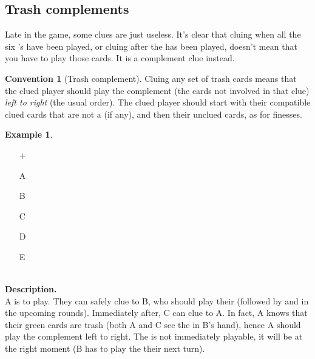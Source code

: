 \documentclass[a4paper]{article}
\theoremstyle{plain}
\theoremstyle{definition}
\newtheorem{example}[theorem]{Example}
\newtheorem{convention}[theorem]{Convention}
\begin{document}
\subsection{Trash complements}

Late in the game, some clues are just useless. It's clear that cluing  when all the six 's have been played, or cluing  after the  has been played, doesn't mean that you have to play those cards. It is a complement clue instead.

\begin{convention}[Trash complement]
	Cluing any set of trash cards means that the clued player should play the complement (the cards not involved in that clue) \emph{left to right} (the usual order). The clued player should start with their compatible clued cards that are not a  (if any), and then their unclued cards, as for finesses.
\end{convention}

\begin{example}	\hfill \\
	\begin{minipage}{0.45\textwidth}
		\begin{itemize}
			\item[\Large +]      
			\item[\Large A]    
			\item[\Large B]    
			\item[\Large C]    
			\item[\Large D]    
			\item[\Large E]    
		\end{itemize}
	\end{minipage}%
	\begin{minipage}{0.55\textwidth}
		\hfill \\
		
		\textbf{Description.} \\
		
		A is to play. They can safely clue  to B, who should play their  (followed by  and  in the upcoming rounds). Immediately after, C can clue  to A. In fact, A knows that their green cards are trash (both A and C see the  in B's hand), hence A should play the complement left to right. The  is not immediately playable, it will be at the right moment (B has to play the  their next turn).
	\end{minipage}
\end{example} \vspace{0.15 cm}
\end{document}
